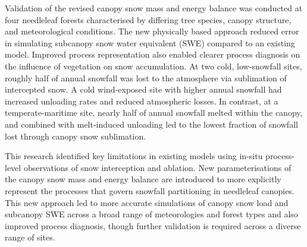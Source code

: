 {Validation of the revised canopy snow mass and energy balance was conducted at four needleleaf forests characterised by differing tree species, canopy structure, and meteorological conditions. The new physically based approach reduced error in simulating subcanopy snow water equivalent (SWE) compared to an existing model. Improved process representation also enabled clearer process diagnosis on the influence of vegetation on snow accumulation. At two cold, low-snowfall sites, roughly half of annual snowfall was lost to the atmosphere via sublimation of intercepted snow. A cold wind-exposed site with higher annual snowfall had increased unloading rates and reduced atmospheric losses. In contrast, at a temperate-maritime site, nearly half of annual snowfall melted within the canopy, and combined with melt-induced unloading led to the lowest fraction of snowfall lost through canopy snow sublimation.

This research identified key limitations in existing models using in-situ process-level observations of snow interception and ablation. New parameterisations of the canopy snow mass and energy balance are introduced to more explicitly represent the processes that govern snowfall partitioning in needleleaf canopies. This new approach led to more accurate simulations of canopy snow load and subcanopy SWE across a broad range of meteorologies and forest types and also improved process diagnosis, though further validation is required across a diverse range of sites.
}
